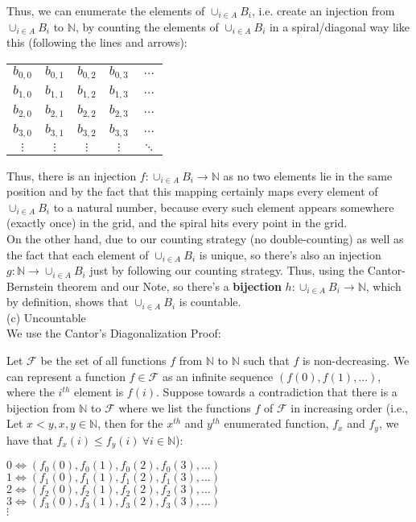 \documentclass{article}
\begin{document}
Thus, we can enumerate the elements of $\cup_{i\in A}B_i$, i.e. create an injection from $\cup_{i\in A}B_i$ to $\mathbb{N}$, by counting the elements of $\cup_{i\in A}B_i$ in a spiral/diagonal way like this (following the lines and arrows):
\begin{center}
\begin{tabular} { c c c c c }
    $b_{0,0}$ & $b_{0,1}$ & $b_{0,2}$ & $b_{0,3}$ & $\dots$ \\
    $b_{1,0}$ & $b_{1,1}$ & $b_{1,2}$ & $b_{1,3}$ & $\dots$ \\
    $b_{2,0}$ & $b_{2,1}$ & $b_{2,2}$ & $b_{2,3}$ & $\dots$ \\
    $b_{3,0}$ & $b_{3,1}$ & $b_{3,2}$ & $b_{3,3}$ & $\dots$ \\
    $\vdots$ & $\vdots$ & $\vdots$ & $\vdots$ & $\ddots$
\end{tabular}
\end{center}

Thus, there is an injection $f:\cup_{i\in A}B_i\rightarrow\mathbb{N}$ as no two elements lie in the same position and by the fact that this mapping certainly maps every element of $\cup_{i\in A}B_i$ to a natural number,
because every such element appears somewhere (exactly once) in the grid, and the spiral hits every point in the grid. \\[.2cm]
\indent On the other hand, due to our counting strategy (no double-counting) as well as the fact that each element of $\cup_{i\in A}B_i$ is unique,
so there's also an injection $g:\mathbb{N}\rightarrow \cup_{i\in A}B_i$ just by following our counting strategy.
Thus, using the Cantor-Bernstein theorem and our Note, so there's a \textbf{bijection} $h:\cup_{i\in A}B_i\rightarrow\mathbb{N}$, which by definition, shows that $\cup_{i\in A}B_i$ is countable. \pagebreak\\
(c) Uncountable \\

We use the Cantor’s Diagonalization Proof:

Let $\mathscr{F}$ be the set of all functions $f$ from $\mathbb{N}$ to $\mathbb{N}$ such that $f$ is non-decreasing. We can represent a function $f\in\mathscr{F}$ as an infinite sequence $(f(0), f(1), ...)$, where the $i^{th}$ element is $f(i)$. Suppose towards a contradiction that there is a bijection from $\mathbb{N}$ to $\mathscr{F}$ where we list the functions $f$ of $\mathscr{F}$ in increasing order
(i.e., Let $x<y, x,y\in\mathbb{N}$, then for the $x^{th}$ and $y^{th}$ enumerated function, $f_x$ and $f_y$, we have that $f_x(i) \leq f_y(i)\ \forall i\in\mathbb{N}$):
\begin{center}
$0\iff (f_0(0), f_0(1), f_0(2), f_0(3), ...)$ \\
$1\iff (f_1(0), f_1(1), f_1(2), f_1(3), ...)$ \\
$2\iff (f_2(0), f_2(1), f_2(2), f_2(3), ...)$ \\
$3\iff (f_3(0), f_3(1), f_3(2), f_3(3), ...)$ \\
$\vdots$
\end{center}
\end{document}
